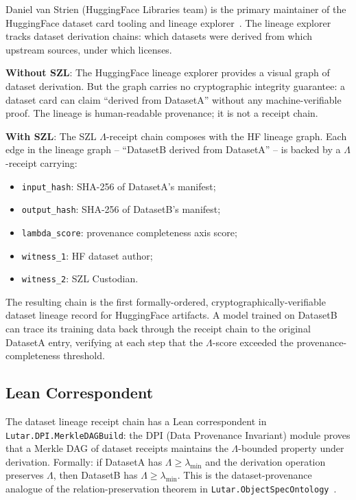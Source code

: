 Daniel van Strien (HuggingFace Libraries team) is the primary maintainer
of the HuggingFace dataset card tooling and lineage explorer~\cite{van_strien_dev}.
The lineage explorer tracks dataset derivation chains: which datasets were
derived from which upstream sources, under which licenses.

\textbf{Without SZL}: The HuggingFace lineage explorer provides a visual
graph of dataset derivation.  But the graph carries no cryptographic integrity
guarantee: a dataset card can claim ``derived from DatasetA'' without any
machine-verifiable proof.  The lineage is human-readable provenance; it is
not a receipt chain.

\textbf{With SZL}: The SZL $\Lambda$-receipt chain composes with the HF
lineage graph.  Each edge in the lineage graph -- ``DatasetB derived from
DatasetA'' -- is backed by a $\Lambda$-receipt carrying:
\begin{itemize}
  \item \texttt{input\_hash}: SHA-256 of DatasetA's manifest;
  \item \texttt{output\_hash}: SHA-256 of DatasetB's manifest;
  \item \texttt{lambda\_score}: provenance completeness axis score;
  \item \texttt{witness\_1}: HF dataset author;
  \item \texttt{witness\_2}: SZL Custodian.
\end{itemize}

The resulting chain is the first formally-ordered, cryptographically-verifiable
dataset lineage record for HuggingFace artifacts.  A model trained on
DatasetB can trace its training data back through the receipt chain to the
original DatasetA entry, verifying at each step that the $\Lambda$-score
exceeded the provenance-completeness threshold.

\subsection{Lean Correspondent}
\label{ssec:lineage-lean}

The dataset lineage receipt chain has a Lean correspondent in
\texttt{Lutar.DPI.MerkleDAGBuild}: the DPI (Data Provenance Invariant) module
proves that a Merkle DAG of dataset receipts maintains the $\Lambda$-bounded
property under derivation.  Formally: if DatasetA has $\Lambda \geq \lambda_{\min}$
and the derivation operation preserves $\Lambda$, then DatasetB has
$\Lambda \geq \lambda_{\min}$.  This is the dataset-provenance analogue
of the relation-preservation theorem in
\texttt{Lutar.ObjectSpecOntology}~\cite{lutar_v14_doi}.

